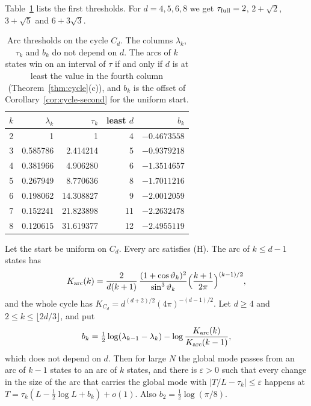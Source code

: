 Table~\ref{tab:cycles} lists the first thresholds. For $d=4,5,6,8$ we get
$\tau_{\rm full}=2$, $2+\sqrt2$, $3+\sqrt5$ and $6+3\sqrt3$.

\begin{table}[t]
\centering\small
\begin{tabular}{@{}crrrr@{}}
\toprule
$k$ & $\lambda_k$ & $\tau_k$ & least $d$ & $b_k$\\
\midrule
2 & 1 & 1 & 4 & $-0.4673558$\\
3 & 0.585786 & 2.414214 & 5 & $-0.9379218$\\
4 & 0.381966 & 4.906280 & 6 & $-1.3514657$\\
5 & 0.267949 & 8.770636 & 8 & $-1.7011216$\\
6 & 0.198062 & 14.308827 & 9 & $-2.0012059$\\
7 & 0.152241 & 21.823898 & 11 & $-2.2632478$\\
8 & 0.120615 & 31.619377 & 12 & $-2.4955119$\\
\bottomrule
\end{tabular}
\caption{Arc thresholds on the cycle $C_d$. The columns $\lambda_k$, $\tau_k$
and $b_k$ do not depend on $d$. The arcs of $k$ states win on an interval of
$\tau$ if and only if $d$ is at least the value in the fourth column
(Theorem~\ref{thm:cycle}(c)), and $b_k$ is the offset of
Corollary~\ref{cor:cycle-second} for the uniform start.}
\label{tab:cycles}
\end{table}


\begin{corollary}\label{cor:cycle-second}
Let the start be uniform on $C_d$. Every arc satisfies (H). The arc of $k\le d-1$
states has
\[
K_{\rm arc}(k)=\frac{2}{d(k+1)}\,\frac{(1+\cos\vartheta_k)^2}{\sin^3\vartheta_k}
\Bigl(\frac{k+1}{2\pi}\Bigr)^{(k-1)/2},
\]
and the whole cycle has $K_{C_d}=d^{(d+2)/2}(4\pi)^{-(d-1)/2}$. Let $d\ge4$ and
$2\le k\le\lfloor2d/3\rfloor$, and put
\[
b_k=\tfrac12\log(\lambda_{k-1}-\lambda_k)-\log\frac{K_{\rm arc}(k)}{K_{\rm arc}(k-1)},
\]
which does not depend on $d$. Then for large $N$ the global mode passes from an
arc of $k-1$ states to an arc of $k$ states, and there is $\varepsilon>0$ such
that every change in the size of the arc that carries the global mode with
$\lvert T/L-\tau_k\rvert\le\varepsilon$ happens at $T=\tau_k(L-\frac12\log L+b_k)+o(1)$. Also $b_2=\frac12\log(\pi/8)$.
\end{corollary}

